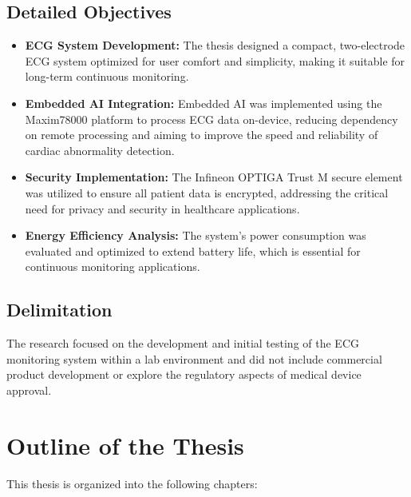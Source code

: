 \subsection{Detailed Objectives}

\begin{itemize}
	\item \textbf{ECG System Development:} The thesis designed a compact, two-electrode ECG system optimized for user comfort and simplicity, making it suitable for long-term continuous monitoring.
	\item \textbf{Embedded AI Integration:} Embedded \ac{AI} was implemented using the Maxim78000 platform to process ECG data on-device, reducing dependency on remote processing and aiming to improve the speed and reliability of cardiac abnormality detection.
	\item \textbf{Security Implementation:} The Infineon OPTIGA Trust M secure element was utilized to ensure all patient data is encrypted, addressing the critical need for privacy and security in healthcare applications.
	\item \textbf{Energy Efficiency Analysis:} The system's power consumption was evaluated and optimized to extend battery life, which is essential for continuous monitoring applications.
\end{itemize}

\subsection{Delimitation}

The research focused on the development and initial testing of the ECG monitoring system within a lab environment and did not include commercial product development or explore the regulatory aspects of medical device approval.

\section{Outline of the Thesis}

This thesis is organized into the following chapters:

